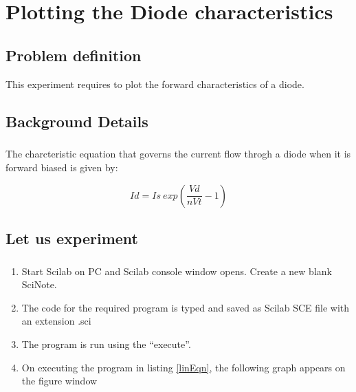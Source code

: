 \chapter [Plotting the Diode characteristics]{Plotting the Diode characteristics}


\section*{Problem definition}

This experiment requires to plot the forward characteristics of a diode. 

\section*{Background Details}
\paragraph{}

The charcteristic equation that governs the current flow throgh a diode when it is forward biased is given by:

\begin{equation}
Id=Is\ exp(\frac{Vd}{n Vt}-1)
\end{equation}
\paragraph{}

\section*{Let us experiment}

\paragraph{}
\begin{enumerate}
\item
Start Scilab on PC and Scilab console window opens. Create a new blank SciNote.
\item
The code for the required program is typed and saved as Scilab SCE file with an extension .sci
\item
The program is run using the “execute”.
\item
On executing the program in listing \ref{linEqn}, the following graph appears on the figure window

\end{enumerate}


